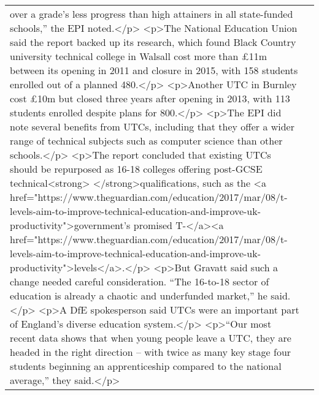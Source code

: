 \documentclass[]{article}
\begin{document}
\begin{table}[!h]
{\begin{tabular}[t]{ll}
over a grade’s less progress than high attainers in all state-funded schools,” the EPI noted.</p> <p>The National Education Union said the report backed up its research, which found Black Country university technical college in Walsall cost more than £11m between its opening in 2011 and closure in 2015, with 158 students enrolled out of a planned 480.</p> <p>Another UTC in Burnley cost £10m but closed three years after opening in 2013, with 113 students enrolled despite plans for 800.</p> <p>The EPI did note several benefits from UTCs, including that they offer a wider range of technical subjects such as computer science than other schools.</p> <p>The report concluded that existing UTCs should be repurposed as 16-18 colleges offering post-GCSE technical<strong> </strong>qualifications, such as the <a href="https://www.theguardian.com/education/2017/mar/08/t-levels-aim-to-improve-technical-education-and-improve-uk-productivity">government’s promised T-</a><a href="https://www.theguardian.com/education/2017/mar/08/t-levels-aim-to-improve-technical-education-and-improve-uk-productivity">levels</a>.</p> <p>But Gravatt said such a change needed careful consideration. “The 16-to-18 sector of education is already a chaotic and underfunded market,” he said.</p> <p>A DfE spokesperson said UTCs were an important part of England’s diverse education system.</p> <p>“Our most recent data shows that when young people leave a UTC, they are headed in the right direction – with twice as many key stage four students beginning an apprenticeship compared to the national average,” they said.</p>\\

\end{tabular}}
\end{table}
\end{document}

